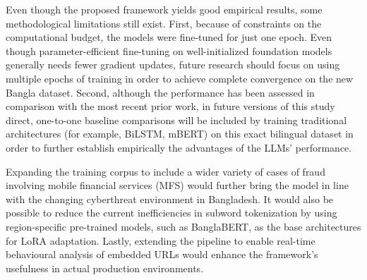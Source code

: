 \documentclass[journal]{IEEEtran}
\begin{document}
Even though the proposed framework yields good empirical results, some methodological limitations still exist. First, because of constraints on the computational budget, the models were fine-tuned for just one epoch. Even though parameter-efficient fine-tuning on well-initialized foundation models generally needs fewer gradient updates, future research should focus on using multiple epochs of training in order to achieve complete convergence on the new Bangla dataset. Second, although the performance has been assessed in comparison with the most recent prior work, in future versions of this study direct, one-to-one baseline comparisons will be included by training traditional architectures (for example, BiLSTM, mBERT) on this exact bilingual dataset in order to further establish empirically the advantages of the LLMs' performance.

Expanding the training corpus to include a wider variety of cases of fraud involving mobile financial services (MFS) would further bring the model in line with the changing cyberthreat environment in Bangladesh. It would also be possible to reduce the current inefficiencies in subword tokenization by using region-specific pre-trained models, such as BanglaBERT, as the base architectures for LoRA adaptation. Lastly, extending the pipeline to enable real-time behavioural analysis of embedded URLs would enhance the framework's usefulness in actual production environments.






\end{document}
